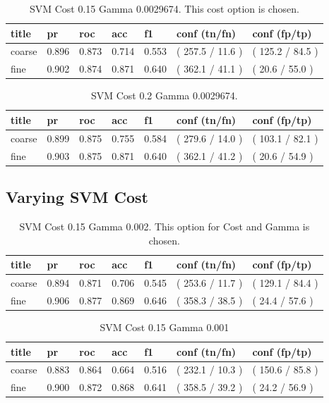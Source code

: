 \documentclass[ms]{nuthesis}
\begin{document}
\FloatBarrier
\begin{table}[H]
\centering
\begin{tabular}{|l||l||l||l||l||l||l|}\toprule
title & pr & roc & acc & f1 & conf (tn/fn) & conf (fp/tp) \\ \midrule
coarse & 0.896 & 0.873 & 0.714 & 0.553 & ( 257.5 / 11.6 ) & ( 125.2 / 84.5 ) \\
fine & 0.902 & 0.874 & 0.871 & 0.640 & ( 362.1 / 41.1 ) & ( 20.6 / 55.0 ) \\ \bottomrule
\end{tabular}
\caption{SVM Cost 0.15 Gamma 0.0029674. This cost option is chosen.}
\label{tab:SVM-Cp15-Gp0029674}
\end{table}
\FloatBarrier


\FloatBarrier
\begin{table}[H]
\centering
\begin{tabular}{|l||l||l||l||l||l||l|}\toprule
title & pr & roc & acc & f1 & conf (tn/fn) & conf (fp/tp) \\ \midrule
coarse & 0.899 & 0.875 & 0.755 & 0.584 & ( 279.6 / 14.0 ) & ( 103.1 / 82.1 ) \\
fine & 0.903 & 0.875 & 0.871 & 0.640 & ( 362.1 / 41.2 ) & ( 20.6 / 54.9 ) \\ \bottomrule
\end{tabular}
\caption{SVM Cost 0.2 Gamma 0.0029674.}
\label{tab:SVM-Cp2-Gp0029674}
\end{table}
\FloatBarrier

\subsection{Varying SVM Cost}

\FloatBarrier
\begin{table}[H]
\centering
\begin{tabular}{|l||l||l||l||l||l||l|}\toprule
title & pr & roc & acc & f1 & conf (tn/fn) & conf (fp/tp) \\ \midrule
coarse & 0.894 & 0.871 & 0.706 & 0.545 & ( 253.6 / 11.7 ) & ( 129.1 / 84.4 ) \\
fine & 0.906 & 0.877 & 0.869 & 0.646 & ( 358.3 / 38.5 ) & ( 24.4 / 57.6 ) \\ \bottomrule
\end{tabular}
\caption{SVM Cost 0.15 Gamma 0.002. This option for Cost and Gamma is chosen.}
\label{tab:SVM-Cp15-Gp002}
\end{table}
\FloatBarrier

\FloatBarrier
\begin{table}[H]
\centering
\begin{tabular}{|l||l||l||l||l||l||l|}\toprule
title & pr & roc & acc & f1 & conf (tn/fn) & conf (fp/tp) \\ \midrule
coarse & 0.883 & 0.864 & 0.664 & 0.516 & ( 232.1 / 10.3 ) & ( 150.6 / 85.8 ) \\
fine & 0.900 & 0.872 & 0.868 & 0.641 & ( 358.5 / 39.2 ) & ( 24.2 / 56.9 ) \\ \bottomrule
\end{tabular}
\caption{SVM Cost 0.15 Gamma 0.001}
\label{tab:SVM-Cp15-Gp001}
\end{table}
\FloatBarrier
\end{document}
